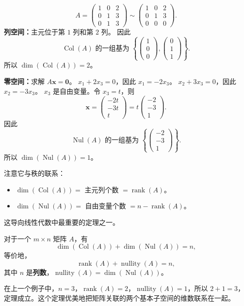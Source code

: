 \begin{example}
\[
A=\begin{pmatrix}1&0&2\\0&1&3\\0&1&3\end{pmatrix}
\sim
\begin{pmatrix}1&0&2\\0&1&3\\0&0&0\end{pmatrix}.
\]
\textbf{列空间：}主元位于第 $1$ 列和第 $2$ 列。
因此
\[
\operatorname{Col}(A)\text{ 的一组基为 }\left\{\begin{pmatrix}1\\0\\0\end{pmatrix},\begin{pmatrix}0\\1\\1\end{pmatrix}\right\}.
\]
所以 $\dim(\operatorname{Col}(A))=2$。

\textbf{零空间：}求解 $A\mathbf{x}=\mathbf{0}$。
$x_1+2x_3=0$，因此 $x_1=-2x_3$。
$x_2+3x_3=0$，因此 $x_2=-3x_3$。
$x_3$ 是自由变量。令 $x_3=t$，则
\[
\mathbf{x}=\begin{pmatrix}-2t\\-3t\\t\end{pmatrix}=t\begin{pmatrix}-2\\-3\\1\end{pmatrix}.
\]
因此
\[
\operatorname{Nul}(A)\text{ 的一组基为 }\left\{\begin{pmatrix}-2\\-3\\1\end{pmatrix}\right\}.
\]
所以 $\dim(\operatorname{Nul}(A))=1$。
\end{example}

注意它与秩的联系：
\begin{itemize}
    \item $\dim(\operatorname{Col}(A))=$ 主元列个数 $=\operatorname{rank}(A)$。
    \item $\dim(\operatorname{Nul}(A))=$ 自由变量个数 $=n-\operatorname{rank}(A)$。
\end{itemize}
这导向线性代数中最重要的定理之一。

\begin{theorem}[秩--零化度定理]
对于一个 $m\times n$ 矩阵 $A$，有
\[ \dim(\operatorname{Col}(A))+\dim(\operatorname{Nul}(A))=n, \]
等价地，
\[ \operatorname{rank}(A)+\operatorname{nullity}(A)=n, \]
其中 $n$ 是\textbf{列数}，$\operatorname{nullity}(A)=\dim(\operatorname{Nul}(A))$。
\end{theorem}
在上一个例子中，$n=3$，$\operatorname{rank}(A)=2$，$\operatorname{nullity}(A)=1$，所以 $2+1=3$，定理成立。这个定理优美地把矩阵关联的两个基本子空间的维数联系在一起。

